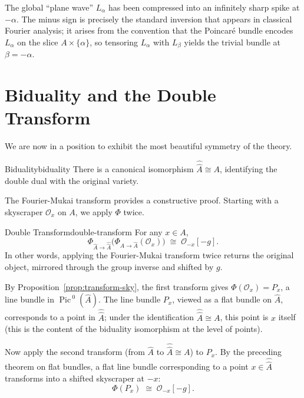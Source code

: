 \documentclass{article}
\newcommand{\CO}{{\mathcal{O}}}
\newcommand{\Pic}{{\operatorname{Pic}\,}}
\begin{document}
The global ``plane wave'' $L_\alpha$ has been compressed into an infinitely sharp spike at $-\alpha$. The minus sign is precisely the standard inversion that appears in classical Fourier analysis; it arises from the convention that the Poincar\'{e} bundle encodes $L_\alpha$ on the slice $A \times \{\alpha\}$, so tensoring $L_\alpha$ with $L_\beta$ yields the trivial bundle at $\beta = -\alpha$.


\section{Biduality and the Double Transform}

We are now in a position to exhibit the most beautiful symmetry of the theory.

\begin{thm}{Biduality}{biduality}
There is a canonical isomorphism $\hat{\hat{A}} \cong A$, identifying the double dual with the original variety.
\end{thm}

The Fourier-Mukai transform provides a constructive proof. Starting with a skyscraper $\CO_x$ on $A$, we apply $\Phi$ twice.

\begin{cor}{Double Transform}{double-transform}
For any $x \in A$,
\[
    \Phi_{\hat{A} \to \hat{\hat{A}}}\bigl(\Phi_{A \to \hat{A}}(\CO_x)\bigr) \;\cong\; \CO_{-x}[-g].
\]
In other words, applying the Fourier-Mukai transform twice returns the original object, mirrored through the group inverse and shifted by $g$.
\end{cor}

\begin{Proof}
By Proposition~\ref{prop:transform-sky}, the first transform gives $\Phi(\CO_x) = P_x$, a line bundle in $\Pic^0(\hat{A})$. The line bundle $P_x$, viewed as a flat bundle on $\hat{A}$, corresponds to a point in $\hat{\hat{A}}$; under the identification $\hat{\hat{A}} \cong A$, this point is $x$ itself (this is the content of the biduality isomorphism at the level of points).

Now apply the second transform (from $\hat{A}$ to $\hat{\hat{A}} \cong A$) to $P_x$. By the preceding theorem on flat bundles, a flat line bundle corresponding to a point $x \in \hat{\hat{A}}$ transforms into a shifted skyscraper at $-x$:
\[
    \Phi(P_x) \;\cong\; \CO_{-x}[-g].
\]
\end{Proof}
\end{document}
